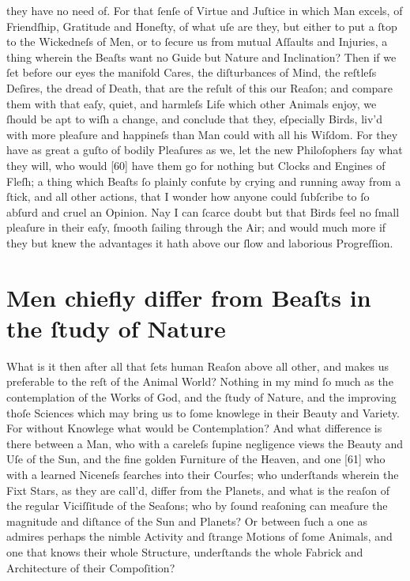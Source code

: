 \documentclass[letterpaper]{book}
\begin{document}
they have no need of. For that ſenſe of Virtue and Juſtice in which Man
excels, of Friendſhip, Gratitude and Honeſty, of what uſe are they, but
either to put a ſtop to the Wickedneſs of Men, or to ſecure us from mutual
Aſſaults and Injuries, a thing wherein the Beaſts want no Guide but Nature
and Inclination? Then if we ſet before our eyes the manifold Cares, the
diſturbances of Mind, the reſtleſs Deſires, the dread of Death, that are the
reſult of this our Reaſon; and compare them with that eaſy, quiet, and
harmleſs Life which other Animals enjoy, we ſhould be apt to wiſh a
change, and conclude that they, eſpecially Birds, liv'd with more pleaſure
and happineſs than Man could with all his Wiſdom. For they have as great a
guſto of bodily Pleaſures as we, let the new Philoſophers ſay what they
will, who would [60] have them go for nothing but Clocks and Engines of
Fleſh; a thing which Beaſts ſo plainly confute by crying and running away
from a ſtick, and all other actions, that I wonder how anyone could
ſubſcribe to ſo abſurd and cruel an Opinion. Nay I can ſcarce doubt but that
Birds feel no ſmall pleaſure in their eaſy, ſmooth ſailing through the Air;
and would much more if they but knew the advantages it hath above our ſlow
and laborious Progreſſion.



\section{Men chiefly differ from Beaſts in the ſtudy of Nature}

What is it then after all that ſets human Reaſon above all other, and makes
us preferable to the reſt of the Animal World? Nothing in my mind ſo much
as the contemplation of the Works of God, and the ſtudy of Nature, and
the improving thoſe Sciences which may bring us to ſome knowlege in their
Beauty and Variety. For without Knowlege what would be Contemplation?
And what difference is there between a Man, who with a careleſs ſupine negligence views the Beauty and Uſe of the Sun, and the fine golden Furniture
of the Heaven, and one [61] who with a learned Niceneſs ſearches into their
Courſes; who underſtands wherein the Fixt Stars, as they are call'd, differ
from the Planets, and what is the reaſon of the regular Viciſſitude of the
Seaſons; who by ſound reaſoning can meaſure the magnitude and diſtance
of the Sun and Planets? Or between ſuch a one as admires perhaps the
nimble Activity and ſtrange Motions of ſome Animals, and one that knows
their whole Structure, underſtands the whole Fabrick and Architecture of
their Compoſition?
\end{document}
